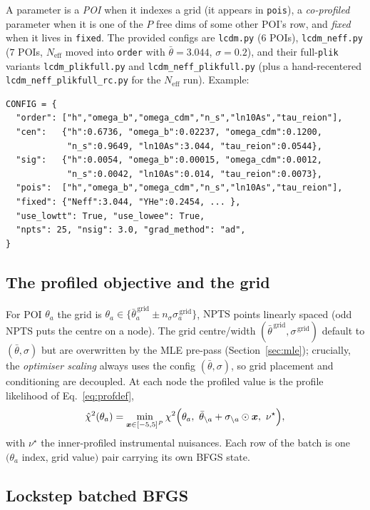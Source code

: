\documentclass[11pt]{article}
\newcommand{\code}[1]{\texttt{\small #1}}
\newcommand{\Neff}{N_{\mathrm{eff}}}
\newcommand{\chisq}{\chi^2}
\begin{document}
A parameter is a \emph{POI} when it indexes a grid (it appears in
\code{pois}), a \emph{co-profiled} parameter when it is one of the $P$
free dims of some other POI's row, and \emph{fixed} when it lives in
\code{fixed}. The provided configs are \code{lcdm.py} ($6$ POIs),
\code{lcdm\_neff.py} ($7$ POIs, $\Neff$ moved into \code{order} with
$\bar\theta=3.044$, $\sigma=0.2$), and their full-\code{plik} variants
\code{lcdm\_plikfull.py} and \code{lcdm\_neff\_plikfull.py} (plus a
hand-recentered \code{lcdm\_neff\_plikfull\_rc.py} for the $\Neff$ run).
Example:
\begin{lstlisting}
CONFIG = {
  "order": ["h","omega_b","omega_cdm","n_s","ln10As","tau_reion"],
  "cen":   {"h":0.6736, "omega_b":0.02237, "omega_cdm":0.1200,
            "n_s":0.9649, "ln10As":3.044, "tau_reion":0.0544},
  "sig":   {"h":0.0054, "omega_b":0.00015, "omega_cdm":0.0012,
            "n_s":0.0042, "ln10As":0.014, "tau_reion":0.0073},
  "pois":  ["h","omega_b","omega_cdm","n_s","ln10As","tau_reion"],
  "fixed": {"Neff":3.044, "YHe":0.2454, ... },
  "use_lowtt": True, "use_lowee": True,
  "npts": 25, "nsig": 3.0, "grad_method": "ad",
}
\end{lstlisting}

\subsection{The profiled objective and the grid}
\label{sec:profobj}

For POI $\theta_a$ the grid is
$\theta_a\in\{\bar\theta_a^{\,\mathrm{grid}}\pm n_\sigma\sigma_a^{\,\mathrm{grid}}\}$,
$\mathrm{NPTS}$ points linearly spaced (odd $\mathrm{NPTS}$ puts the
centre on a node). The grid centre/width $(\bar\theta^{\,\mathrm{grid}},
\sigma^{\,\mathrm{grid}})$ default to $(\bar\theta,\sigma)$ but are
overwritten by the MLE pre-pass (Section~\ref{sec:mle}); crucially, the
\emph{optimiser scaling} always uses the config $(\bar\theta,\sigma)$, so
grid placement and conditioning are decoupled. At each node the profiled
value is the profile likelihood of Eq.~\eqref{eq:profdef},
\begin{equation}
\hat\chisq(\theta_a)=\min_{\bm x\in[-5,5]^{P}}
\chisq\Bigl(\theta_a,\ \bar\theta_{\setminus a}+\sigma_{\setminus a}\odot\bm
x,\ \nu^\star\Bigr),
\end{equation}
with $\nu^\star$ the inner-profiled instrumental nuisances. Each row of
the batch is one $(\theta_a$ index, grid value$)$ pair carrying its own
BFGS state.

\subsection{Lockstep batched BFGS}
\label{sec:lockstep}
\end{document}
